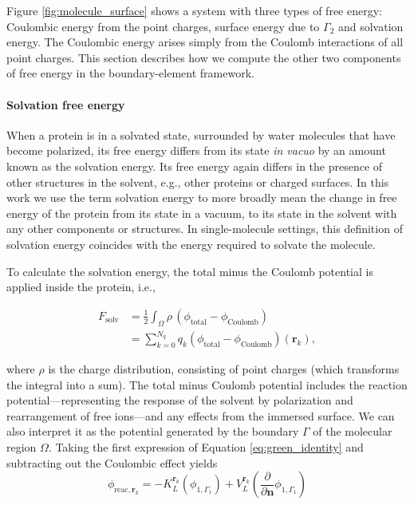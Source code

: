 
Figure \ref{fig:molecule_surface} shows a system with three types of free energy: Coulombic energy from the point charges, surface energy due to $\Gamma_2$ and solvation energy. The Coulombic energy arises simply from the Coulomb interactions of all point charges. This section describes how we compute the other two components of free energy in the boundary-element framework.

\medskip

\paragraph*{Solvation free energy}

When a protein is in a solvated state, surrounded by water molecules that have become polarized, its free energy differs from its state \emph{in vacuo} by an amount known as the solvation energy. Its free energy again differs in the presence of other structures in the solvent, e.g., other proteins or charged surfaces. In this work we use the term solvation energy to more broadly mean the change in free energy of the protein from its state in a vacuum, to its state in the solvent with any other components or structures. In single-molecule settings, this definition of solvation energy coincides with the energy required to solvate the molecule. 

To calculate the solvation energy, the total minus the Coulomb potential is applied inside the protein, i.e.,

\begin{align} \label{eq:solv_energy}
F_{\text{solv}} &= \frac{1}{2} \int_{\Omega} \rho \,(\phi_{\text{total}} - \phi_{\text{Coulomb}}) \\
&= \sum_{k=0}^{N_q} q_k (\phi_{\text{total}} - \phi_{\text{Coulomb}})(\mathbf{r}_k),
\end{align}

\noindent where $\rho$ is the charge distribution, consisting of point charges (which transforms the integral into a sum). 
The total minus Coulomb potential includes the reaction potential---representing the response of the solvent by polarization and rearrangement of free ions---and any effects from the immersed surface.
We can also interpret it as the potential generated by the boundary $\Gamma$ of the molecular region $\Omega$. Taking the first expression of Equation \eqref{eq:green_identity} and subtracting out the Coulombic effect yields
%
\begin{equation} \label{eq:phi_reac_bem}
\phi_{\text{reac},\mathbf{r}_k} = -K_{L}^{\mathbf{r}_k}(\phi_{1,\Gamma_1}) + V_{L}^{\mathbf{r}_k} \left(\frac{\partial}{\partial \mathbf{n}}\phi_{1,\Gamma_1} \right) 
\end{equation}

